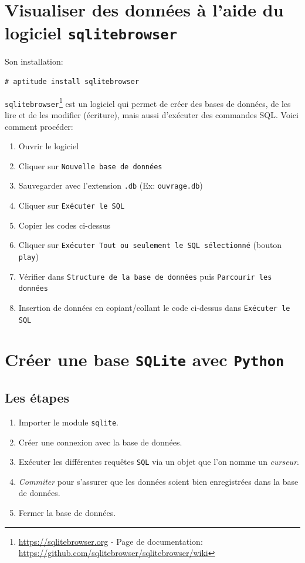 \documentclass[a4paper,12pt]{book}
\begin{document}
\section{Visualiser des données à l'aide du logiciel \texttt{sqlitebrowser}}
Son installation:
\begin{verbatim}
# aptitude install sqlitebrowser
\end{verbatim}
\medskip

\texttt{sqlitebrowser}\footnote{\url{https://sqlitebrowser.org} - Page de documentation: \url{https://github.com/sqlitebrowser/sqlitebrowser/wiki}} est un logiciel qui permet de créer des bases de données, de les lire et de les modifier (écriture), mais aussi d'exécuter des commandes SQL. Voici comment procéder:
\begin{enumerate}
	\item Ouvrir le logiciel
	\item Cliquer sur \og \texttt{Nouvelle base de données}\fg
	\item Sauvegarder avec l'extension \texttt{.db} (Ex: \texttt{ouvrage.db})
	\item Cliquer sur \og \texttt{Exécuter le SQL}\fg
	\item Copier les codes ci-dessus
	\item Cliquer sur \og \texttt{Exécuter Tout ou seulement le SQL sélectionné}\fg{} (bouton \og \texttt{play}\fg{})
	\item Vérifier dans \og \texttt{Structure de la base de données}\fg{} puis \og \texttt{Parcourir les données}\fg
	\item  Insertion de données en copiant/collant le code ci-dessus dans \og \texttt{Exécuter le SQL}\fg
\end{enumerate}
\medskip

\section{Créer une base \texttt{SQLite} avec \texttt{Python}}
\subsection*{Les étapes}
\begin{enumerate}
	\item Importer le module \texttt{sqlite}.
	\item Créer une connexion avec la base de données.
	\item Exécuter les différentes requêtes \texttt{SQL} via un objet que l'on nomme un \textit{curseur}.
	\item \textit{Commiter} pour s'assurer que les données soient bien enregistrées dans la base de données.
	\item Fermer la base de données.
\end{enumerate}
\medskip
\end{document}
